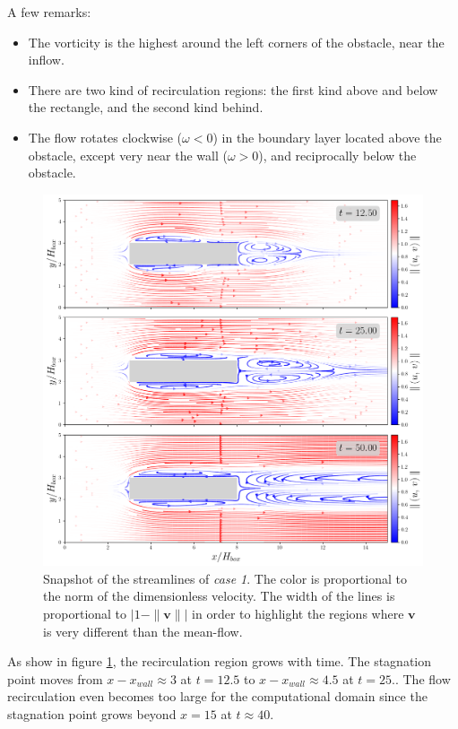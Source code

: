 \documentclass[11 pt]{article}
\begin{document}
A few remarks:
\begin{itemize}
    \item The vorticity is the highest around the left corners of the obstacle, near the inflow.
    \item There are two kind of recirculation regions: the first kind above and below the rectangle, and the second kind behind.
    \item The flow rotates clockwise ($\omega < 0$) in the boundary layer located above the obstacle, except very near the wall ($\omega > 0$), and reciprocally below the obstacle.
\end{itemize}

\begin{figure}[H]
    \centering
    \includegraphics[width=\textwidth]{../figures/streamlines_case_1.png}
    \caption{Snapshot of the streamlines of \textit{case 1}. The color is proportional to the norm of the dimensionless velocity. The width of the lines is proportional to $\left|1 - \|\mathbf{v}\|\right|$ in order to highlight the regions where $\mathbf{v}$ is very different than the mean-flow.}
    \label{fig:streamlines_1}
\end{figure}
As show in figure \ref{fig:streamlines_1}, the recirculation region grows with time. The stagnation point moves from $x-x_{wall} \approx 3$ at $t=12.5$ to $x - x_{wall} \approx 4.5$ at $t=25.$. The flow recirculation even becomes too large for the computational domain since the stagnation point grows beyond $x=15$ at $t \approx 40$.
\end{document}
